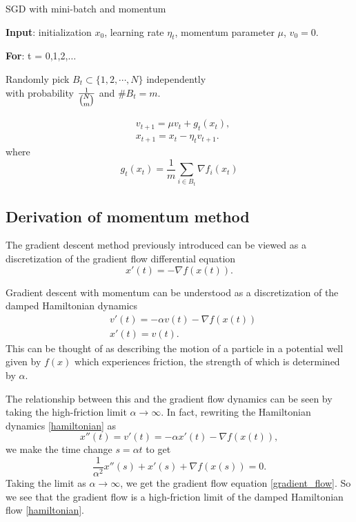\begin{algorithm}[H]\caption{SGD with mini-batch and momentum}
	\label{alg:batch-momentum-SGD}
	{\bf Input}: initialization $x_0$, learning rate $\eta_t$, momentum parameter $\mu$, $v_0=0$.
	
	{\bf For}: t = 0,1,2,$\dots$ 
	
	\begin{center}
		Randomly pick $B_t \subset \{1, 2, \cdots, N\}$ independently \\
		with probability $\frac{1}{\tbinom{N}{m}}$ and $\# B_t = m$.
	\end{center}
	\begin{align}\label{equ:sgd-iteration-momentum}
	&v_{t+1} = \mu v_t + g_t(x_t),\\
	&x_{t+1} = x_{t} - \eta_t v_{t+1}.
	\end{align}
	\quad where 
	$$
	g_{t}(x_t) = \frac{1}{m} \sum_{i \in B_{t}}  \nabla f_i(x_t)
	$$
\end{algorithm}


\subsection{Derivation of momentum method} 


The gradient descent method previously introduced can be viewed as a discretization of the gradient flow differential equation
\begin{equation}\label{gradient_flow}
 x'(t) = -\nabla f(x(t)).
\end{equation}

Gradient descent with momentum can be understood as a discretization of the damped Hamiltonian dynamics
\begin{equation}\label{hamiltonian}
 \begin{split}
  &v'(t) = -\alpha v(t) - \nabla f(x(t)) \\
  &x'(t) = v(t).
 \end{split}
\end{equation}
This can be thought of as describing the motion of a particle in a potential well given by $f(x)$ which experiences friction, the strength of which is determined by $\alpha$.

The relationship between this and the gradient flow dynamics can be seen by taking the high-friction limit $\alpha\rightarrow \infty$. In fact, rewriting the Hamiltonian dynamics \eqref{hamiltonian} as
\begin{equation}
 x''(t) = v'(t) = -\alpha x'(t) - \nabla f(x(t)),
\end{equation}
we make the time change $s = \alpha t$ to get
\begin{equation}
 \frac{1}{\alpha^2}x''(s) + x'(s) +\nabla f(x(s)) = 0. 
\end{equation}
Taking the limit as $\alpha\rightarrow \infty$, we get the gradient flow equation \eqref{gradient_flow}. So we see that the gradient flow is a high-friction limit of the damped Hamiltonian flow \eqref{hamiltonian}.

